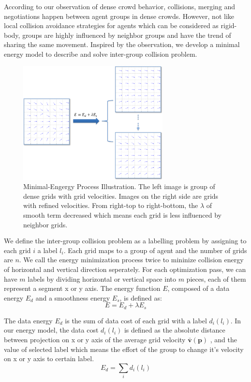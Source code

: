 \documentclass{egpubl}
\begin{document}
According to our observation of dense crowd behavior, collisions, merging and negotiations happen between agent groups in dense crowds. However, not like local collision avoidance strategies for agents which can be considered as rigid-body, groups are highly influenced by neighbor groups and have the trend of sharing the same movement. Inspired by the observation, we develop a minimal energy model to describe and solve inter-group collision problem.

\begin{figure}
\centering
  \includegraphics[width=3in]{images/energy}
  \caption{Minimal-Engergy Process Illustration. The left image is group of dense grids with grid velocities. Images on the right side are grids with refined velocities. From right-top to right-bottom, the $\lambda$ of smooth term decreased which means each grid is less influenced by neighbor grids.}
  \label{fig:energy_model}
\end{figure}

We define the inter-group collision problem as a labelling problem by assigning to each grid $i$ a label $l_i$. Each grid maps to a group of agent and the number of grids are $n$. We call the energy minimization process twice to mininize collision energy of horizontal and vertical direction seperately. For each optimization pass, we can have $m$ labels by dividing horizontal or vertical space into $m$ pieces, each of them represent a segment x or y axis. The energy function $E$, composed of a data energy $E_d$ and a smoothness energy $E_s$, is defined as:
\begin{equation}
\label{eq:4}
E = E_d + \lambda E_s
\end{equation}

The data energy $E_d$ is the sum of data cost of each grid with a label $d_i(l_i)$. In our energy model, the data cost $d_i(l_i)$ is defined as the absolute distance between projection on x or y axis of the average grid velocity $\bar{\textbf{v}}(\textbf{p})$ , and the value of selected label which means the effort of the group to change it's velocity on x or y axis to certain label.
\begin{equation}
\label{eq:5}
E_d = \sum_{i}d_i(l_i)
\end{equation}
\end{document}
